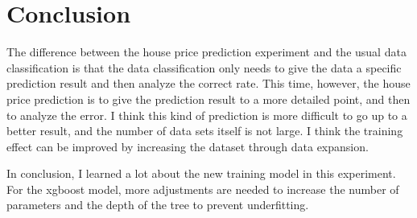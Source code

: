 \documentclass{amsart}
\begin{document}
	\section{Conclusion}\label{sec-intro}
	The difference between the house price prediction experiment and the usual data classification is that the data classification only needs to give the data a specific prediction result and then analyze the correct rate. This time, however, the house price prediction is to give the prediction result to a more detailed point, and then to analyze the error. I think this kind of prediction is more difficult to go up to a better result, and the number of data sets itself is not large. I think the training effect can be improved by increasing the dataset through data expansion.
	\par In conclusion, I learned a lot about the new training model in this experiment. For the xgboost model, more adjustments are needed to increase the number of parameters and the depth of the tree to prevent underfitting.
\end{document}
